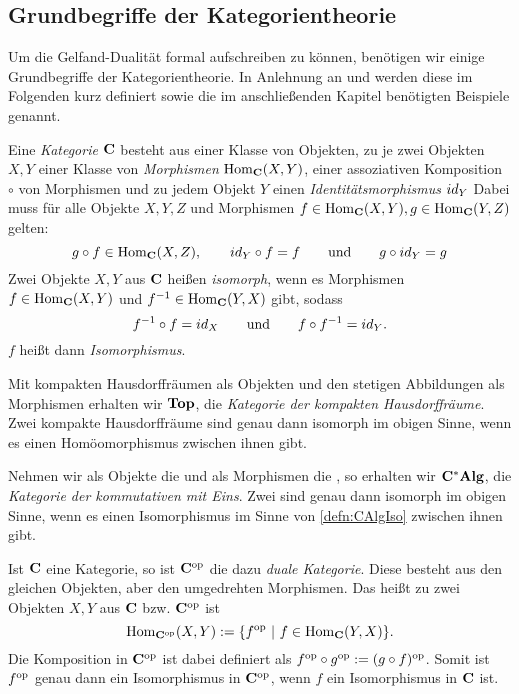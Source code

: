 \subsection{Grundbegriffe der Kategorientheorie}\label{sec:Kategorientheorie}

Um die Gelfand-Dualität formal aufschreiben zu können, benötigen wir einige Grundbegriffe der Kategorientheorie. In Anlehnung an \cite[S. 2-23]{Pizza2013} und \cite[S. 1-6]{Ambrogio2009} werden diese im Folgenden kurz definiert sowie die im anschließenden Kapitel benötigten Beispiele genannt.

\begin{defn}[Kategorie]
Eine \emph{Kategorie} $\mathbf{C}$ besteht aus einer Klasse von Objekten, zu je zwei Objekten $X, Y$ einer Klasse von \emph{Morphismen} $\mathrm{Hom}_{\mathbf{C}}(X,Y)$, einer assoziativen Komposition $\circ$ von Morphismen und zu jedem Objekt $Y$ einen \emph{Identitätsmorphismus} $id_Y$ Dabei muss für alle Objekte $X, Y, Z$ und Morphismen $f \in \mathrm{Hom}_{\mathbf{C}}(X,Y), g \in \mathrm{Hom}_{\mathbf{C}}(Y,Z)$ gelten:
	\[g \circ f \in \mathrm{Hom}_{\mathbf{C}}(X,Z),\qquad id_Y \circ f = f \qquad\text{und}\qquad g \circ id_Y = g\]
Zwei Objekte $X, Y$ aus $\mathbf{C}$ heißen \emph{isomorph}, wenn es Morphismen $f \in \mathrm{Hom}_{\mathbf{C}}(X,Y)$ und $f^{-1} \in\mathrm{Hom}_{\mathbf{C}}(Y,X)$ gibt, sodass
	\[f^{-1} \circ f = id_X \qquad\text{und}\qquad f \circ f^{-1} = id_Y.\]
	$f$ heißt dann \emph{Isomorphismus}.
\end{defn}

\begin{bsp}
Mit kompakten Hausdorffräumen als Objekten und den stetigen Abbildungen als Morphismen erhalten wir $\mathbf{Top}$, die \emph{Kategorie der kompakten Hausdorffräume}. Zwei kompakte Hausdorffräume sind genau dann isomorph im obigen Sinne, wenn es einen Homöomorphismus zwischen ihnen gibt.
\end{bsp}

\begin{bsp}
Nehmen wir als Objekte die \CAlgn{} und als Morphismen die \CAlgHomn{}, so erhalten wir $\mathbf{C^*Alg}$, die \emph{Kategorie der kommutativen \CAlgn{} mit Eins}. Zwei \CAlgn{} sind genau dann isomorph im obigen Sinne, wenn es einen Isomorphismus im Sinne von \cref{defn:CAlgIso} zwischen ihnen gibt.
\end{bsp}

\begin{bsp}
Ist $\mathbf{C}$ eine Kategorie, so ist $\mathbf{C}^{\mathrm{op}}$ die dazu \emph{duale Kategorie}. Diese besteht aus den gleichen Objekten, aber den \glqq umgedrehten\grqq{} Morphismen. Das heißt zu zwei Objekten $X, Y$ aus $\mathbf{C}$ bzw. $\mathbf{C}^{\mathrm{op}}$ ist 
	\[\mathrm{Hom}_{\mathbf{C}^{\mathrm{op}}}(X,Y) := \{f^{\mathrm{op}} ~|~ f \in \mathrm{Hom}_{\mathbf{C}}(Y,X)\}.\]
Die Komposition in $\mathbf{C}^{\mathrm{op}}$ ist dabei definiert als $f^{\mathrm{op}} \circ g^{\mathrm{op}} := (g \circ f)^{\mathrm{op}}$. Somit ist $f^{\mathrm{op}}$ genau dann ein Isomorphismus in $\mathbf{C}^{\mathrm{op}}$, wenn $f$ ein Isomorphismus in $\mathbf{C}$ ist.
\end{bsp}


